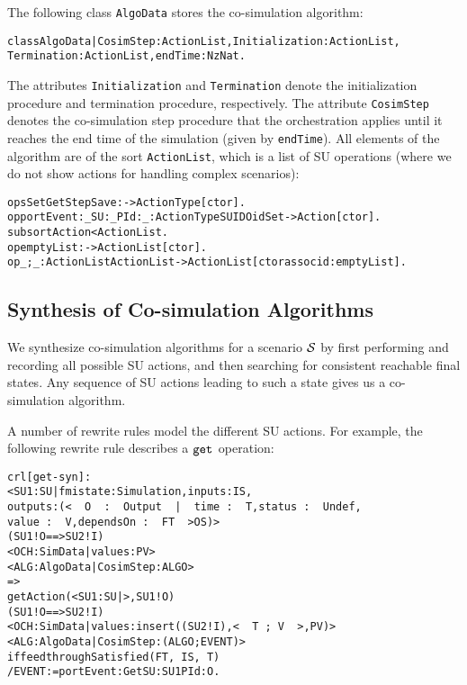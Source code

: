 The following class \texttt{AlgoData} stores the co-simulation
algorithm: 

\small
\begin{alltt}
class AlgoData | CosimStep : ActionList,   Initialization : ActionList, 
                 Termination : ActionList, endTime : NzNat .
\end{alltt}
\normalsize

\noindent 
The attributes \texttt{Initialization} and \texttt{Termination} denote
the initialization procedure and termination procedure, respectively. 
The attribute \texttt{CosimStep} denotes the co-simulation step
procedure that the orchestration applies until it reaches the end time
of the simulation (given by 
\texttt{endTime}). 
All elements of the algorithm are of the sort \texttt{ActionList},
which is a list of SU operations (where we do not show actions for
handling complex scenarios):

\small
\begin{alltt}
ops Set Get Step Save : -> ActionType [ctor] . 
op portEvent:_SU:_PId:_ : ActionType SUID OidSet -> Action [ctor] .
subsort Action < ActionList .
op emptyList : -> ActionList [ctor] .
op _;_ : ActionList ActionList -> ActionList [ctor assoc id: emptyList] .
\end{alltt}
\normalsize



\subsection{Synthesis of Co-simulation Algorithms}
We synthesize co-simulation algorithms for a scenario
$\mathcal{S}$ by first  performing and recording all possible SU
actions, 
and then searching for consistent reachable final states. 
Any sequence of SU actions leading to such a state gives us a
co-simulation algorithm. 

A number of rewrite rules model the different SU actions.
For example, the following rewrite rule describes a $\mathtt{get}_{}$ operation:
\small
\begin{alltt}
crl [get-syn] :
    < SU1 : SU | fmistate : Simulation, inputs : IS, 
                  outputs : (<\,\,O\,\,:\,\,Output\,\,|\,\,time\,:\,\,T,  status\,:\,\,Undef, 
                                          value\,:\,\,V, dependsOn\,:\,\,FT\,\,> OS) > 
    (SU1 ! O ==> SU2 ! I)
    < OCH : SimData | values : PV > 
    < ALG : AlgoData | CosimStep : ALGO >
    => 
    getAction(< SU1 : SU | >, SU1 ! O)
    (SU1 ! O ==> SU2 ! I)
    < OCH : SimData | values : insert((SU2 ! I), <\,\,T\,;\,V\,\,>, PV) >  
    < ALG : AlgoData | CosimStep : (ALGO ; EVENT) >
  if feedthroughSatisfied(FT,\,IS,\,T) 
    / EVENT := portEvent: Get SU: SU1 PId: O . 
\end{alltt}
\normalsize

